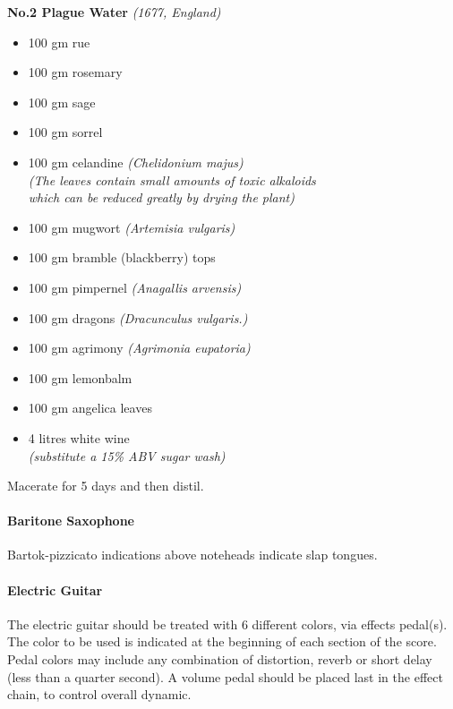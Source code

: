 \documentclass[11pt]{report}
\begin{document}
\begin{titlepage}
\begin{multicols}{3}
{
    \textbf{No.2 Plague Water} \emph{(1677, England)}
    \vspace*{\baselineskip}
    \begin{itemize}
        \renewcommand{\labelitemi}{$\circ$}
        \item 100 gm rue
        \item 100 gm rosemary
        \item 100 gm sage
        \item 100 gm sorrel
        \item 100 gm celandine \emph{(Chelidonium majus)\\
            [0.4\baselineskip]
            (The leaves contain small amounts of toxic alkaloids\\
            which can be reduced greatly by drying the plant)}
        \item 100 gm mugwort \emph{(Artemisia vulgaris)}
        \item 100 gm bramble (blackberry) tops
        \item 100 gm pimpernel \emph{(Anagallis arvensis)}
        \item 100 gm dragons \emph{(Dracunculus vulgaris.)}
        \item 100 gm agrimony \emph{(Agrimonia eupatoria)}
        \item 100 gm lemonbalm
        \item 100 gm angelica leaves
        \item 4 litres white wine\\
            [0.4\baselineskip]
            \emph{(substitute a 15\% ABV sugar wash)}
    \end{itemize}
    \vspace*{\baselineskip}
    Macerate for 5 days and then distil.
}

\columnbreak

{

    \paragraph{Baritone Saxophone}

    Bartok-pizzicato indications above noteheads indicate slap tongues.

    \paragraph{Electric Guitar}

    The electric guitar should be treated with 6 different colors, via effects
    pedal(s). The color to be used is indicated at the beginning of each
    section of the score.  Pedal colors may include any combination of
    distortion, reverb or short delay (less than a quarter second).  A volume
    pedal should be placed last in the effect chain, to control overall
    dynamic.

}
\end{multicols}
\end{titlepage}
\end{document}
